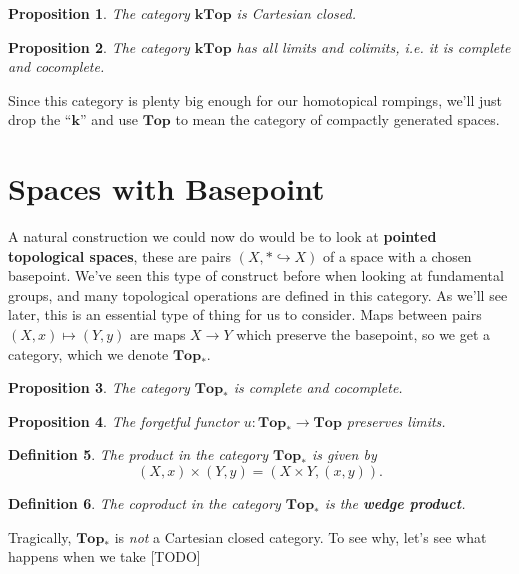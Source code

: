 \documentclass{article}
\newtheorem{definition}{Definition}[subsection]
\newtheorem{proposition}[definition]{Proposition}
\begin{document}
\begin{proposition}
  The category $\mathbf{kTop}$ is Cartesian closed.
\end{proposition}

\begin{proposition}
  The category $\mathbf{kTop}$ has all limits and colimits, i.e. it is complete and cocomplete.
\end{proposition}

Since this category is plenty big enough for our homotopical rompings, we'll just drop the ``$\textbf{k}$'' and use $\textbf{Top}$ to mean the category of compactly generated spaces.

\section{Spaces with Basepoint}

A natural construction we could now do would be to look at \textbf{pointed topological spaces}, these are pairs $(X, * \hookrightarrow X)$ of a space with a chosen basepoint. We've seen this type of construct before when looking at fundamental groups, and many topological operations are defined in this category. As we'll see later, this is an essential type of thing for us to consider. Maps between pairs $(X, x) \mapsto (Y, y)$ are maps $X \to Y$ which preserve the basepoint, so we get a category, which we denote $\mathbf{Top}_*$.

\begin{proposition}
  The category $\mathbf{Top}_*$ is complete and cocomplete.
\end{proposition}

\begin{proposition}
  The forgetful functor $u : \mathbf{Top}_* \to \mathbf{Top}$ preserves limits.
\end{proposition}

\begin{definition}
  The product in the category $\mathbf{Top}_*$ is given by
  \[(X, x)\times (Y, y) = (X\times Y, (x,y)).\]
\end{definition}

\begin{definition}
  The coproduct in the category $\mathbf{Top}_*$ is the \textbf{wedge product}. 
\end{definition}

Tragically, $\mathbf{Top}_*$ is \emph{not} a Cartesian closed category. To see why, let's see what happens when we take [TODO]
\end{document}
